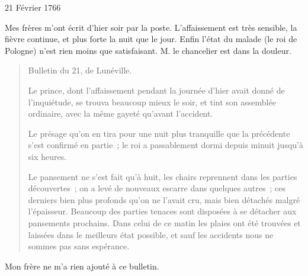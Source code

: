                     
                     \begin{diary}{21 Février 1766}{}
                        
                        
                           Mes
                              frères m'ont écrit d'hier
                              soir par la
                           poste. L'affaissement est très sensible, la
                           fièvre continue, et plus forte la nuit que le
                           jour. Enfin l'état du malade (le roi de Pologne)
                           n'est rien moins que satisfaisant. M. le
                              chancelier
                           est dans la douleur. \bigskip
        
        
                        \begin{quote}\begin{flushright}Bulletin du 21, de
                                 Lunéville.\end{flushright}
                              Le prince, dont
                              l'affaissement pendant la journée
                              d'hier avait donné de l'inquiétude, se trouva beaucoup
                              mieux le soir, et tint son assemblée ordinaire, avec
                              la même gayeté qu'avant l'accident. \bigskip
        
         Le présage qu'on en tira pour une
                              nuit plus
                              tranquille que la précédente s'est confirmé en
                              partie ; le
                                    roi a passablement dormi depuis
                                    minuit jusqu'à six heures. \bigskip
        
        
                              Le pansement ne s'est fait qu'à huit, les chairs
                                 reprennent dans les parties découvertes ; on a levé
                                 de nouveaux escarre dans quelques autres ; ces
                                 derniers bien plus profonds qu'on ne l'avait cru,
                                 mais bien détachés malgré l'épaisseur. Beaucoup
                              des parties tenaces sont disposées à se détacher
                              aux pansements prochains. Dans celui de
                              ce matin les plaies ont été trouvées et
                              laissées dans le meilleurs état possible, et
                              sauf les accidents nous ne sommes pas
                              sans espérance. \bigskip
        
        \end{quote}
                        
                           Mon frère ne m'a rien ajouté à ce
                           bulletin. \bigskip
        
        
                     \end{diary}
                     

